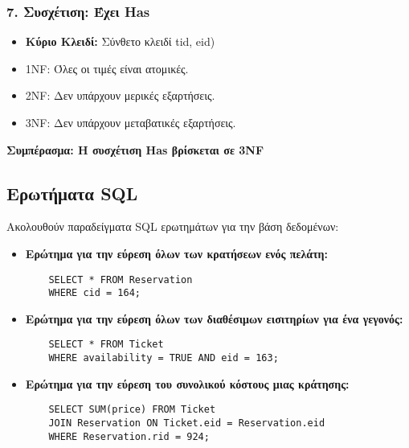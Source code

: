\documentclass{article}
\begin{document}
\subsubsection*{7. Συσχέτιση: Έχει Has}
\begin{itemize}
    \item \textbf{Κύριο Κλειδί:} Σύνθετο κλειδί tid, eid)
    \item 1NF: Όλες οι τιμές είναι ατομικές.
    \item 2NF: Δεν υπάρχουν μερικές εξαρτήσεις.
    \item 3NF: Δεν υπάρχουν μεταβατικές εξαρτήσεις.
\end{itemize}
\textbf{Συμπέρασμα: Η συσχέτιση Has βρίσκεται σε 3NF}
\subsection*{Ερωτήματα SQL}
Ακολουθούν παραδείγματα SQL ερωτημάτων για την βάση δεδομένων:
\begin{itemize}
    \item \textbf{Ερώτημα για την εύρεση όλων των κρατήσεων ενός πελάτη:}
    \begin{lstlisting}
    SELECT * FROM Reservation
    WHERE cid = 164; 
    \end{lstlisting}
    \item \textbf{Ερώτημα για την εύρεση όλων των διαθέσιμων εισιτηρίων για ένα γεγονός:}
    \begin{lstlisting}
    SELECT * FROM Ticket
    WHERE availability = TRUE AND eid = 163;
    \end{lstlisting}
    \item \textbf{Ερώτημα για την εύρεση του συνολικού κόστους μιας κράτησης:}
    \begin{lstlisting}
    SELECT SUM(price) FROM Ticket
    JOIN Reservation ON Ticket.eid = Reservation.eid
    WHERE Reservation.rid = 924;
    \end{lstlisting}
\end{itemize}
\end{document}
